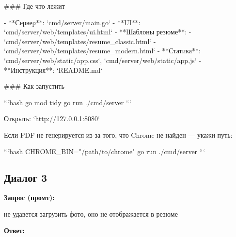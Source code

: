 \documentclass[a4paper, 14pt]{extarticle} %
\begin{document}
\begin{AnswerBlock}
### Где что лежит

- **Сервер**: `cmd/server/main.go`
- **UI**: `cmd/server/web/templates/ui.html`
- **Шаблоны резюме**:  
  - `cmd/server/web/templates/resume_classic.html`  
  - `cmd/server/web/templates/resume_modern.html`
- **Статика**: `cmd/server/web/static/app.css`, `cmd/server/web/static/app.js`
- **Инструкция**: `README.md`

### Как запустить

```bash
go mod tidy
go run ./cmd/server
```

Открыть: `http://127.0.0.1:8080`

Если PDF не генерируется из‑за того, что Chrome не найден — укажи путь:

```bash
CHROME_BIN="/path/to/chrome" go run ./cmd/server
```

\end{AnswerBlock}

\subsection*{Диалог 3}

\textbf{Запрос (промт):}

\begin{PromptBlock}

не удавется загрузить фото, оно не отображается в резюме

\end{PromptBlock}

\textbf{Ответ:}
\end{document}
